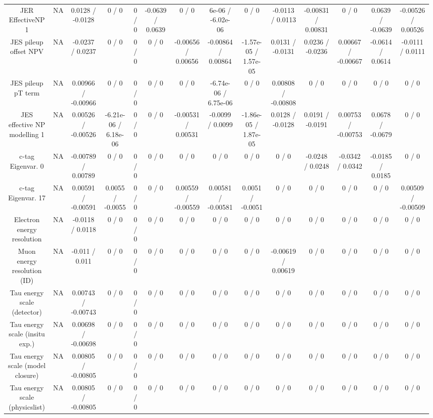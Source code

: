 \documentclass[10pt]{article}
\begin{document}
\begin{table}[htbp]
\begin{center}
\begin{tabular}{|c|c|c|c|c|c|c|c|c|c|c|c|c|c|}
  JER EffectiveNP 1 &    NA    & 0.0128 / -0.0128 & 0 / 0 & 0 / 0 & -0.0639 / 0.0639 & 0 / 0 & 6e-06 / -6.02e-06 & 0 / 0 & -0.0113 / 0.0113 & -0.00831 / 0.00831 & 0 / 0 & 0.0639 / -0.0639 & -0.00526 / 0.00526 \\ 
  JES pileup offset NPV &    NA    & -0.0237 / 0.0237 & 0 / 0 & 0 / 0 & 0 / 0 & -0.00656 / 0.00656 & -0.00864 / 0.00864 & -1.57e-05 / 1.57e-05 & 0.0131 / -0.0131 & 0.0236 / -0.0236 & 0.00667 / -0.00667 & -0.0614 / 0.0614 & -0.0111 / 0.0111 \\ 
  JES pileup pT term &    NA    & 0.00966 / -0.00966 & 0 / 0 & 0 / 0 & 0 / 0 & 0 / 0 & -6.74e-06 / 6.75e-06 & 0 / 0 & 0.00808 / -0.00808 & 0 / 0 & 0 / 0 & 0 / 0 & 0 / 0 \\ 
  JES effective NP modelling 1 &    NA    & 0.00526 / -0.00526 & -6.21e-06 / 6.18e-06 & 0 / 0 & 0 / 0 & -0.00531 / 0.00531 & -0.0099 / 0.0099 & -1.86e-05 / 1.87e-05 & 0.0128 / -0.0128 & 0.0191 / -0.0191 & 0.00753 / -0.00753 & 0.0678 / -0.0679 & 0 / 0 \\ 
  c-tag Eigenvar. 0 &    NA    & -0.00789 / 0.00789 & 0 / 0 & 0 / 0 & 0 / 0 & 0 / 0 & 0 / 0 & 0 / 0 & 0 / 0 & -0.0248 / 0.0248 & -0.0342 / 0.0342 & -0.0185 / 0.0185 & 0 / 0 \\ 
  c-tag Eigenvar. 17 &    NA    & 0.00591 / -0.00591 & 0.0055 / -0.0055 & 0 / 0 & 0 / 0 & 0.00559 / -0.00559 & 0.00581 / -0.00581 & 0.0051 / -0.0051 & 0 / 0 & 0 / 0 & 0 / 0 & 0 / 0 & 0.00509 / -0.00509 \\ 
  Electron energy resolution &    NA    & -0.0118 / 0.0118 & 0 / 0 & 0 / 0 & 0 / 0 & 0 / 0 & 0 / 0 & 0 / 0 & 0 / 0 & 0 / 0 & 0 / 0 & 0 / 0 & 0 / 0 \\ 
  Muon energy resolution (ID) &    NA    & -0.011 / 0.011 & 0 / 0 & 0 / 0 & 0 / 0 & 0 / 0 & 0 / 0 & 0 / 0 & -0.00619 / 0.00619 & 0 / 0 & 0 / 0 & 0 / 0 & 0 / 0 \\ 
  Tau energy scale (detector) &    NA    & 0.00743 / -0.00743 & 0 / 0 & 0 / 0 & 0 / 0 & 0 / 0 & 0 / 0 & 0 / 0 & 0 / 0 & 0 / 0 & 0 / 0 & 0 / 0 & 0 / 0 \\ 
  Tau energy scale (insitu exp.) &    NA    & 0.00698 / -0.00698 & 0 / 0 & 0 / 0 & 0 / 0 & 0 / 0 & 0 / 0 & 0 / 0 & 0 / 0 & 0 / 0 & 0 / 0 & 0 / 0 & 0 / 0 \\ 
  Tau energy scale (model closure) &    NA    & 0.00805 / -0.00805 & 0 / 0 & 0 / 0 & 0 / 0 & 0 / 0 & 0 / 0 & 0 / 0 & 0 / 0 & 0 / 0 & 0 / 0 & 0 / 0 & 0 / 0 \\ 
  Tau energy scale (physicslist) &    NA    & 0.00805 / -0.00805 & 0 / 0 & 0 / 0 & 0 / 0 & 0 / 0 & 0 / 0 & 0 / 0 & 0 / 0 & 0 / 0 & 0 / 0 & 0 / 0 & 0 / 0 \\ 

\end{tabular}
\end{center}
\end{table}
\end{document}
